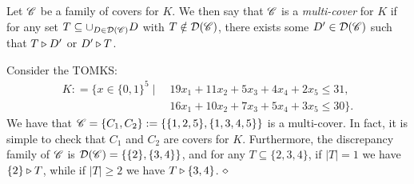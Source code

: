 


\begin{definition}
\label{def:multi-cover}
Let $\mathscr{C}$ be a family of covers for $K$.
We then say that $\mathscr{C}$ is a \emph{multi-cover} for $K$ if for any set $T \subseteq \cup_{D \in \mathcal D(\mathscr{C})} D$ with $T \notin \mathcal{D}(\mathscr{C})$, there exists some $D' \in \mathcal{D}(\mathscr{C})$ such that $T \triangleright D'$ or $D' \triangleright T$.
\end{definition}

\begin{example}
\label{exm: 1}
Consider the TOMKS:
{\small
\begin{align*}
K: = \{x \in \{0,1\}^5 \mid \ & 19 x_1 + 11x_2 + 5x_3 + 4x_4 + 2x_5 \leq 31, \\
& 16 x_1 + 10 x_2 + 7 x_3 + 5 x_4 + 3 x_5  \leq 30\}.
\end{align*}
}
We have that $\mathscr{C} = \{C_1, C_2\} := \{\{1,2,5\},\{1,3,4,5\}\}$ is a multi-cover.
In fact, it is simple to check that $C_1$ and $C_2$ are covers for $K$.
Furthermore, the discrepancy family of $\mathscr{C}$ is $\mathcal{D}(\mathscr{C}) = \{\{2\}, \{3,4\}\}$, and for any $T \subseteq \{2,3,4\}$, if $|T| = 1$ we have $\{2\} \triangleright T$, while if $|T| \geq 2$ we have $T \triangleright \{3,4\}$.
$\hfill\diamond$
\end{example}




